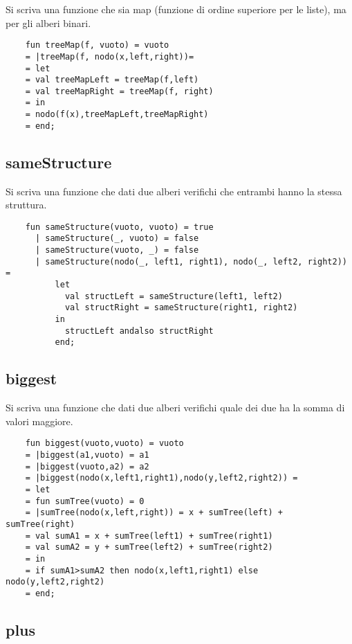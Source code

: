 Si scriva una funzione che sia map (funzione di ordine superiore per le liste), ma per gli alberi binari.

\begin{lstlisting}
    fun treeMap(f, vuoto) = vuoto
    = |treeMap(f, nodo(x,left,right))=
    = let
    = val treeMapLeft = treeMap(f,left)
    = val treeMapRight = treeMap(f, right)
    = in
    = nodo(f(x),treeMapLeft,treeMapRight)
    = end;
\end{lstlisting}

\subsection{sameStructure}

Si scriva una funzione che dati due alberi verifichi che entrambi hanno la stessa struttura.

\begin{lstlisting}
    fun sameStructure(vuoto, vuoto) = true
      | sameStructure(_, vuoto) = false
      | sameStructure(vuoto, _) = false
      | sameStructure(nodo(_, left1, right1), nodo(_, left2, right2)) =
          let
            val structLeft = sameStructure(left1, left2)
            val structRight = sameStructure(right1, right2)
          in
            structLeft andalso structRight
          end;

\end{lstlisting}

\subsection{biggest}

Si scriva una funzione che dati due alberi verifichi quale dei due ha la somma di valori maggiore.

\begin{lstlisting}
    fun biggest(vuoto,vuoto) = vuoto
    = |biggest(a1,vuoto) = a1
    = |biggest(vuoto,a2) = a2
    = |biggest(nodo(x,left1,right1),nodo(y,left2,right2)) =
    = let
    = fun sumTree(vuoto) = 0
    = |sumTree(nodo(x,left,right)) = x + sumTree(left) + sumTree(right)
    = val sumA1 = x + sumTree(left1) + sumTree(right1)
    = val sumA2 = y + sumTree(left2) + sumTree(right2)
    = in
    = if sumA1>sumA2 then nodo(x,left1,right1) else nodo(y,left2,right2)
    = end;
\end{lstlisting}

\subsection{plus}

